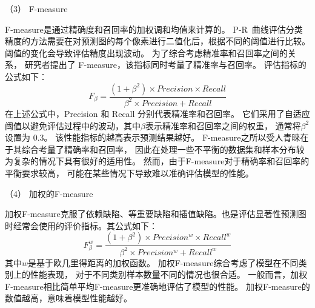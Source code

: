 （3）
F-measure



F-measure是通过精确度和召回率的加权调和均值来计算的。
P-R~曲线评估分类精度的方法需要在对预测图的每个像素进行二值化后，根据不同的阈值进行比较。
阈值的变化会导致评估精度出现波动。
为了综合考虑精准率和召回率之间的关系，
研究者提出了 F-measure，该指标同时考量了精准率与召回率。
评估指标的公式如下：
%
%
\begin{equation}
	F_{\beta} = \frac{\left ( 1 + \beta^{2} \right ) \times Precision \times Recall }{\beta^{2} \times Precision + Recall } 
\end{equation}
%
%
在上述公式中，Precision 和 Recall 分别代表精准率和召回率。
它们采用了自适应阈值以避免评估过程中的波动，其中$\beta$表示精准率和召回率之间的权重，
通常将$\beta^{2}$设置为 0.3。
该性能指标的越高表示预测结果越好。
F-measure之所以受人青睐在于其综合考量了精确率和召回率，
因此在处理一些不平衡的数据集和样本分布较为复杂的情况下具有很好的适用性。
然而，由于F-measure对于精确率和召回率的平衡要求较高，
可能在某些情况下导致难以准确评估模型的性能。








（4）
加权的F-measure\par
%
%
加权F-measure克服了依赖缺陷、等重要缺陷和插值缺陷。也是评估显著性预测图时经常会使用的评价指标。其公式如下：
\begin{equation}
	F_{\beta}^{w} = \frac{\left ( 1 + \beta^{2} \right ) \times Precision^{w}  \times Recall^{w} }{\beta^{2} \times Precision^{w} + Recall^{w} } 
\end{equation}
%
%
其中$w$是基于欧几里得距离的加权函数。
加权F-measure综合考虑了模型在不同类别上的性能表现，
对于不同类别样本数量不同的情况也很合适。
一般而言，加权F-measure相比简单平均F-measure更准确地评估了模型的性能。
加权F-measure的数值越高，意味着模型性能越好。









